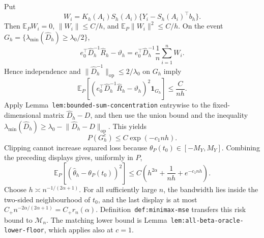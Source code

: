 Put
\[
W_i=K_h(A_i)S_h(A_i)\{Y_i-S_h(A_i)^\top b_h\}.
\]
Then \(\mathbb E_PW_i=0\), \(\lVert W_i\rVert\le C/h\), and \(\mathbb E_P\lVert W_i\rVert^2\le C/h\). On the event \(G_h=\{\lambda_{\min}(\widehat D_h)\ge\lambda_0/2\}\),
\[
e_0^\top\widehat D_h^{-1}\widehat R_h-\vartheta_h
=
e_0^\top\widehat D_h^{-1}\frac1n\sum_{i=1}^nW_i.
\]
Hence independence and \(\lVert\widehat D_h^{-1}\rVert_{\mathrm{op}}\le2/\lambda_0\) on \(G_h\) imply
\[
\mathbb E_P\left[
\left(e_0^\top\widehat D_h^{-1}\widehat R_h-\vartheta_h\right)^2
\mathbf 1_{G_h}
\right]
\le \frac{C}{nh}.
\]
Apply Lemma~\texttt{lem:bounded-sum-concentration} entrywise to the fixed-dimensional matrix \(\widehat D_h-D\), and then use the union bound and the inequality \(\lambda_{\min}(\widehat D_h)\ge\lambda_0-\lVert\widehat D_h-D\rVert_{\mathrm{op}}\). This yields
\[
P(G_h^c)\le C\exp(-c_1nh).
\]
Clipping cannot increase squared loss because \(\theta_P(t_0)\in[-M_Y,M_Y]\). Combining the preceding displays gives, uniformly in \(P\),
\[
\mathbb E_P[(\widehat\theta_h-\theta_P(t_0))^2]
\le
C\left(h^{2\alpha}+\frac1{nh}+e^{-c_1nh}\right).
\]
Choose \(h\asymp n^{-1/(2\alpha+1)}\). For all sufficiently large \(n\), the bandwidth lies inside the two-sided neighbourhood of \(t_0\), and the last display is at most \(C_+n^{-2\alpha/(2\alpha+1)}=C_+r_n(\alpha)\). Definition~\texttt{def:minimax-mse} transfers this risk bound to \(\mathcal M_n\). The matching lower bound is Lemma~\texttt{lem:all-beta-oracle-lower-floor}, which applies also at \(c=1\).